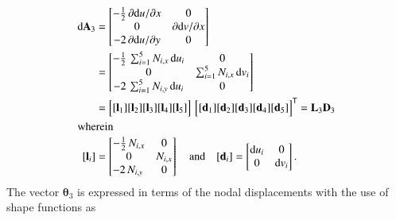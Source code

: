\begin{subequations}
	\begin{align}
		\mathrm{d} \mathbf{A}_3 & =  \begin{bmatrix}
			-\tfrac{1}{2} \, \partial \mathrm{d} u / \partial x &  0 \\
			0 & \partial \mathrm{d} v / \partial x \\
			-2 \, \partial \mathrm{d} u / \partial y  & 0 \end{bmatrix} \notag \\
		& = \begin{bmatrix}
			-\tfrac{1}{2} \, \sum\nolimits_{i=1}^5 N_{i,x} \, \mathrm{d} u_i &  0 \\
			0 &  \sum\nolimits_{i=1}^5 N_{i,x} \, \mathrm{d} v_i \\
			-2 \, \sum\nolimits_{i=1}^5 N_{i,y} \, \mathrm{d} u_i  & 0 \end{bmatrix}\notag \\
		& = \begin{bmatrix}
			[\mathbf{l}_1] [\mathbf{l}_2] [\mathbf{l}_3] [\mathbf{l}_4] [\mathbf{l}_5] 
		\end{bmatrix} \, \begin{bmatrix} [\mathbf{d}_1] [\mathbf{d}_2] [\mathbf{d}_3] [\mathbf{d}_4] [\mathbf{d}_5] \end{bmatrix}^{\mathsf{T}}
		= \mathbf{L}_3 \mathbf{D}_3 \\
		\intertext{wherein}
		[\mathbf{l}_i] & = \begin{bmatrix}
			-\tfrac{1}{2} \, N_{i,x} &  0 \\
		0 &  N_{i,x} \\
			-2 \, N_{i,y} \, & 0 \end{bmatrix}  \quad \text{and} \quad	[\mathbf{d}_i] = \begin{bmatrix}
			\mathrm{d} u_i & 0 \\
			0 &  \mathrm{d} v_i  \end{bmatrix} .
	\end{align}
\end{subequations}
The vector $\boldsymbol{\theta}_3$ is expressed in terms of the nodal displacements with the use of shape functions as
